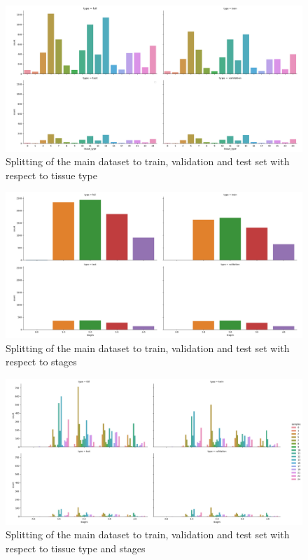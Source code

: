 \begin{figure}
    \centering
    \includegraphics[width=\linewidth]{images/split_tissue.png}
    \caption[Splitting - tissue type]{Splitting of the main dataset to train, validation and test set with respect to tissue type}
    \label{fig:split_tissue}
\end{figure}

\begin{figure}
    \centering
    \includegraphics[width=\linewidth]{images/split_stages.png}   
    \caption[Splitting - stages]{Splitting of the main dataset to train, validation and test set with respect to stages}
    \label{fig:split_stages}
\end{figure}

\begin{figure}
    \centering
    \includegraphics[width=\linewidth]{images/split_all.png}
    \caption[Splitting - combined]{Splitting of the main dataset to train, validation and test set with respect to tissue type and stages}
    \label{fig:split_all}
\end{figure}

